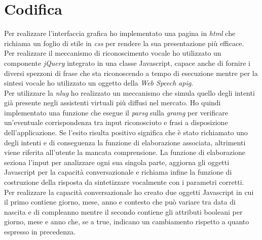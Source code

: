 \section{Codifica}
Per realizzare l'interfaccia grafica ho implementato una pagina in \emph{\gls{html}} che richiama un foglio di stile in \emph{\gls{css}} per rendere la sua presentazione più efficace. \\
Per realizzare il meccanismo di riconoscimento vocale ho utilizzato un componente \emph{jQuery} integrato in una classe Javascript, capace anche di fornire i diversi spezzoni di frase che sta riconoscendo a tempo di esecuzione mentre per la sintesi vocale ho utilizzato un oggetto della \emph{Web Speech} \emph{\gls{apig}}. \\
Per utilizzare la \emph{\gls{nlug}} ho realizzato un meccanismo che simula quello degli intenti già presente negli assistenti virtuali più diffusi nel mercato. Ho quindi implementato una funzione che esegue il \emph{\gls{parsg}} sulla \emph{\gls{gramg}} per verificare un'eventuale corrispondenza tra input riconosciuto e frasi a disposizione dell'applicazione. Se l'esito risulta positivo significa che è stato richiamato uno degli intenti e di conseguenza la funzione di elaborazione associata, altrimenti viene riferita all'utente la mancata comprensione. La funzione di elaborazione seziona l'input per analizzare ogni sua singola parte, aggiorna gli oggetti Javascript per la capacità conversazionale e richiama infine la funzione di costruzione della risposta da sintetizzare vocalmente con i parametri corretti. \\
Per realizzare la capacità conversazionale ho creato due oggetti Javascript in cui il primo contiene giorno, mese, anno e contesto che può variare tra data di nascita e di compleanno mentre il secondo contiene gli attributi booleani per giorno, mese e anno che, se a true, indicano un cambiamento rispetto a quanto espresso in precedenza.
